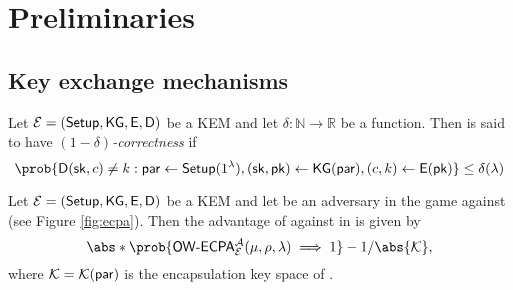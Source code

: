 
\section{Preliminaries}


\subsection{Key exchange mechanisms}


\begin{definition}\label{def:corr}
  Let \(\mathcal{E} = (\mathsf{Setup}, \mathsf{KG}, \mathsf{E}, \mathsf{D})\) be a KEM
  and let \(\delta : \mathbb{N} \to \mathbb{R}\) be a function.
  Then \KEM is said to have \emph{\((1-\delta)\)-correctness} if
  \begin{equation}
    \prob{\Decaps{}(\sk,c) \ne k : \params \assign \Setup{}(1^{\lambda}), (\sk,\pk) \assign \KG{}(\params), (c,k) \assign \Encaps{}(\pk)} \le \delta (\lambda)
  \end{equation}
\end{definition}


\begin{definition}\label{def:OWECPA_sec}
  Let \(\mathcal{E} = (\mathsf{Setup}, \mathsf{KG}, \mathsf{E}, \mathsf{D})\) be a KEM
  and let \advA{} be an adversary in the \OWECPA{} game against \KEM (see Figure \ref{fig:ecpa}).
  Then the advantage of \advA{} against \OWECPA in \KEM is given by
  \begin{equation}
    \abs*{\prob{\OWECPA{}_{\KEM}^{\advA}(\mu,\rho,\lambda) \implies 1} - 1/\abs{\keyspace}},
  \end{equation}
  where \(\mathcal{K} = \mathcal{K}{}(\mathsf{par})\) is the encapsulation key space of \KEM.
\end{definition}

